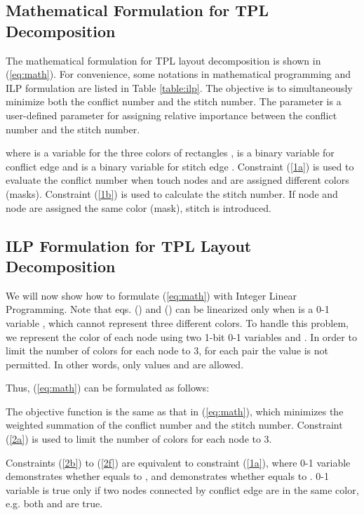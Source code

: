 \documentclass[10pt,conference]{IEEEtran}
\begin{document}
\subsection{Mathematical Formulation for TPL Decomposition}

The mathematical formulation for TPL layout decomposition is shown in (\ref{eq:math}).
For convenience, some notations in mathematical programming and ILP formulation are listed in Table \ref{table:ilp}.
The objective is to simultaneously minimize both the conflict number and the stitch number.
The parameter  is a user-defined parameter for assigning relative importance between the conflict number and the stitch number.


where  is a variable for the three colors of rectangles ,  is a binary variable for conflict edge  and  is a binary variable for  stitch edge . 
Constraint (\ref{1a}) is used to evaluate the conflict number when touch nodes  and  are assigned different colors (masks). Constraint (\ref{1b}) is used to calculate the stitch number. If node  and node  are assigned the same color (mask), stitch  is introduced.



\subsection{ILP Formulation for TPL Layout Decomposition}

We will now show how to formulate (\ref{eq:math}) with Integer Linear Programming.
Note that  eqs. () and () can be linearized only when  is a 0-1 variable \cite{DPL_ICCAD08_Kahng}, which cannot represent three different colors. To handle this problem, we represent the color of each node using two 1-bit 0-1 variables  and .
In order to limit the number of colors for each node to 3, for each pair  the value  is not permitted.
In other words, only values  and  are allowed.


Thus, (\ref{eq:math}) can be formulated as follows:


The objective function is the same as that in (\ref{eq:math}), which minimizes the weighted summation of the conflict number and the stitch number.
Constraint (\ref{2a}) is used to limit the number of colors for each node to 3.


Constraints (\ref{2b}) to (\ref{2f}) are equivalent to constraint (\ref{1a}), where 0-1 variable  demonstrates whether  equals to , and  demonstrates whether  equals to .
0-1 variable  is true only if two nodes connected by conflict edge  are in the same color, e.g. both  and  are true.
\end{document}
